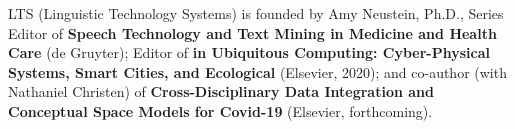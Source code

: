 \documentclass[11pt,letterpaper]{article}
\newcommand{\llMOSAIC}{\mbox{{\LARGE MOSAIC}}}
\newcommand{\llWC}{\mbox{{\LARGE WhiteCharmDB}}}
\begin{document}
\setlength{\skip\footins}{18pt}	
	
{\linespread{1.25}\selectfont

\vspace*{1.5em}

\begin{center}



\begin{tcolorbox}
[
arc=2pt,outer arc=0pt,
enhanced jigsaw,
width=\textwidth,
colback=ctmppppy!40,
colframe=logoRed!30!darkRed,
drop shadow=logoPurple!50!darkRed,
]
\begin{minipage}{\textwidth}	
\begin{center}	
{\setlength{\fboxsep}{32pt}
	}
\end{center}
\end{minipage}
\end{tcolorbox}
\end{center}

\vspace*{2pt}
\begin{center}
\parbox{.88\textwidth}{%
{\fontsize{9}{9}\selectfont   
LTS (Linguistic Technology Systems) is founded by 
Amy Neustein, Ph.D., Series Editor of {\textbf{Speech Technology 
and Text Mining in Medicine and Health Care}} (de Gruyter); 
Editor of {\textbf{ in Ubiquitous Computing: 
Cyber-Physical Systems, Smart Cities, 
and Ecological }} 
(Elsevier, 2020); and 
co-author (with Nathaniel Christen) 
of {\textbf{Cross-Disciplinary Data Integration 
and Conceptual Space Models
for Covid-19}} 
(Elsevier, forthcoming).}}\end{center}

}
\end{document}
